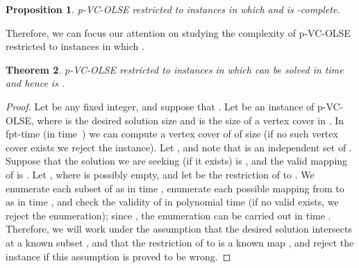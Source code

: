 \documentclass[11pt]{article}
\newtheorem{theorem}{Theorem}[section]
\newtheorem{proposition}[theorem]{Proposition}
\begin{document}
\begin{proposition}
\label{prop:whardnessvc}
p-VC-OLSE restricted to instances in which  and  is -complete.
\end{proposition}

\vspace*{-1mm}
Therefore, we can focus our attention on studying the complexity of p-VC-OLSE restricted to instances in which .
\vspace*{-1mm}
\begin{theorem}
\label{thm:fptvslose}
p-VC-OLSE restricted to instances in which  can be solved in time  and hence is .
\end{theorem}
\vspace*{-3mm}
\begin{proof}
Let  be any fixed integer, and suppose that . Let  be an instance of p-VC-OLSE, where  is the desired solution size and  is the size of a vertex cover in . In fpt-time (in  time~\cite{ckxvc}) we can compute a vertex cover  of  of size  (if no such vertex cover exists we reject the instance). Let , and note that  is an independent set of . Suppose that the solution we are seeking (if it exists) is , and the valid mapping of  is . Let , where  is possibly empty, and let  be the restriction of  to . We enumerate each subset of  as  in time , enumerate each possible mapping from  to  as  in time , and check the validity of  in polynomial time (if no valid  exists, we reject the enumeration); since , the enumeration can be carried out in time . Therefore, we will work under the assumption that the desired solution intersects  at a known subset , and that the restriction of  to  is a known map , and reject the instance if this assumption is proved to be wrong.


\end{proof}
\end{document}
